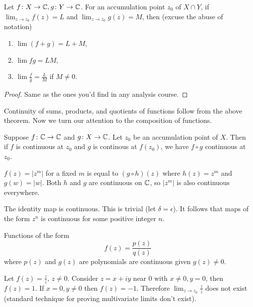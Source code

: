 \begin{theorem}
    Let $f \colon X \to \mathbb{C}, g \colon Y \to \mathbb{C}$. For an accumulation point $z_0$ of $X\cap Y$, if $\lim_{z\to z_0}f(z)=L$ and $\lim_{z\to z_0}g(z)=M$, then (excuse the abuse of notation)
    \begin{enumerate}
        \item $\lim(f+g)=L+M$,
        \item $\lim fg=LM$,
        \item $\lim \frac{f}{g}=\frac{L}{M}$ if $M\neq 0$.
    \end{enumerate}
\end{theorem}
\begin{proof}
    Same as the ones you'd find in any analysis course.
\end{proof}
Continuity of sums, products, and quotients of functions follow from the above theorem. Now we turn our attention to the composition of functions.
\begin{theorem}
    Suppose  $f \colon \mathbb{C} \to \mathbb{C}$ and $g \colon X \to \mathbb{C}$. Let $z_0$ be an accumulation point of $X$. Then if $f$ is continuous at $z_0$ and $g$ is continous at $f(z_0)$, we have $f \circ g$ continuous at $z_0$.
\end{theorem}
\begin{example}
    $f(z)=|z^m|$ for a fixed $m$ is equal to $(g\circ h)(z)$ where  $h(z)=z^m$ and $g(w)=|w|$. Both $h$ and $g$ are continuous on $\mathbb{C}$, so $|z^m|$ is also continuous everywhere.
\end{example}
\begin{example}
    The identity map is continuous. This is trivial (let $\delta = \epsilon$). It follows that maps of the form $z^{n}$ is continuous for some positive integer $n$.
\end{example}
\begin{cor}
    Functions of the form \[
        f(z)=\frac{p(z)}{q(z)}
    \]
    where $p(z)$ and $g(z)$ are polynomials are continuous given $g(z) \neq 0$.
\end{cor}
\begin{example}
    Let $f(z)=\frac{z}{\bar{z}}, \, z \neq 0$. Consider $z=x+iy$ near $0$ with $x\neq 0, y=0$, then $f(z)=1$. If $x=0, y\neq 0$ then $f(z)=-1$. Therefore $\lim_{z\to z_0}\frac{z}{\bar{z}}$ does not exist (standard technique for proving multivariate limits don't exist).
\end{example}
